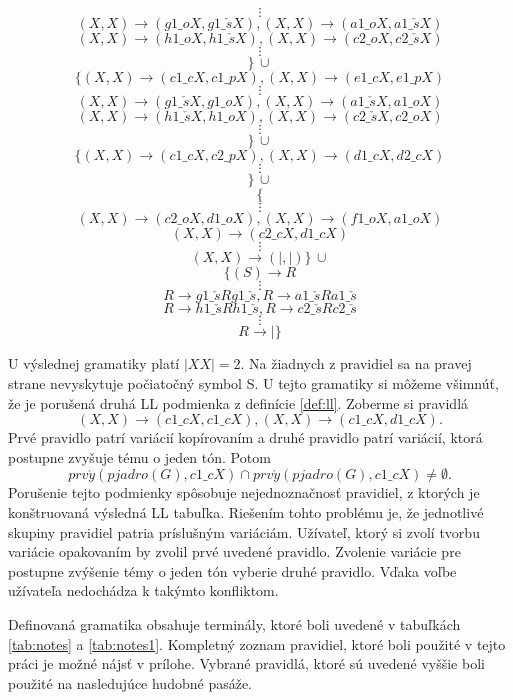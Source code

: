\begin{definition}
$$\vdots$$
$$(X,X) \rightarrow (g1\_oX, g1\_\check{s}X), (X,X) \rightarrow (a1\_oX, a1\_\check{s}X)$$
$$(X,X) \rightarrow (h1\_oX, h1\_\check{s}X), (X,X) \rightarrow (c2\_oX, c2\_\check{s}X)$$
$$\vdots$$
$$\}\, \cup$$
$$\{(X,X) \rightarrow (c1\_cX, c1\_pX), (X,X) \rightarrow (e1\_cX, e1\_pX)$$
$$\vdots$$
$$(X,X) \rightarrow (g1\_\check{s}X, g1\_oX), (X,X) \rightarrow (a1\_\check{s}X, a1\_oX)$$
$$(X,X) \rightarrow (h1\_\check{s}X, h1\_oX), (X,X) \rightarrow (c2\_\check{s}X, c2\_oX)$$
$$\vdots$$
$$\}\, \cup$$
$$\{(X,X) \rightarrow (c1\_cX, c2\_pX), (X,X) \rightarrow (d1\_cX, d2\_cX)$$
$$\vdots$$
$$\}\, \cup$$
$$\{$$
$$\vdots$$
$$(X,X) \rightarrow (c2\_oX, d1\_oX), (X,X) \rightarrow (f1\_oX, a1\_oX)$$
$$(X,X) \rightarrow (c2\_cX, d1\_cX)$$
$$\vdots$$
$$(X,X) \rightarrow (|, |)\}\, \cup$$
$$\{(S) \rightarrow R$$
$$\vdots$$
$$R \rightarrow g1\_\check{s}Rg1\_\check{s}, R \rightarrow a1\_\check{s}Ra1\_\check{s}$$
$$R \rightarrow h1\_\check{s}Rh1\_\check{s}, R \rightarrow c2\_\check{s}Rc2\_\check{s}$$
$$\vdots$$
$$R \rightarrow |\}$$

U výslednej gramatiky platí $|XX| = 2$. Na žiadnych z pravidiel sa na pravej strane nevyskytuje počiatočný symbol S. U tejto gramatiky si môžeme všimnúť, že je porušená druhá LL podmienka z definície \ref{def:ll}. Zoberme si pravidlá $$(X,X) \rightarrow (c1\_cX, c1\_cX), (X,X) \rightarrow (c1\_cX, d1\_cX).$$ Prvé pravidlo patrí variácií kopírovaním a druhé pravidlo patrí variácií, ktorá postupne zvyšuje tému o jeden tón. Potom $$prv\acute{y}(pjadro(G),c1\_cX) \cap prv\acute{y}(pjadro(G),c1\_cX) \neq \emptyset.$$ Porušenie tejto podmienky spôsobuje nejednoznačnosť pravidiel, z ktorých je konštruovaná výsledná LL tabuľka. Riešením tohto problému je, že jednotlivé skupiny pravidiel patria príslušným variáciám. Užívateľ, ktorý si zvolí tvorbu variácie opakovaním by zvolil prvé uvedené pravidlo. Zvolenie variácie pre postupne zvýšenie témy o jeden tón vyberie druhé pravidlo. Vďaka voľbe užívateľa nedochádza k takýmto konfliktom.
\end{definition}

Definovaná gramatika obsahuje terminály, ktoré boli uvedené v tabuľkách \ref{tab:notes} a \ref{tab:notes1}. Kompletný zoznam pravidiel, ktoré boli použité v tejto práci je možné nájsť v prílohe. Vybrané pravidlá, ktoré sú uvedené vyššie boli použité na nasledujúce hudobné pasáže.


